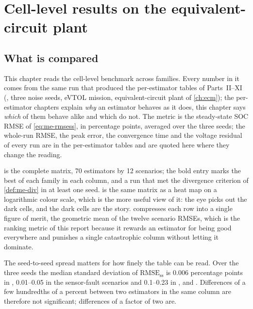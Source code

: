 \chapter{Cell-level results on the equivalent-circuit plant}
\label{ch:res-cell_ecm}

\section{What is compared}

This chapter reads the cell-level benchmark across families. Every number in it comes from
the same run that produced the per-estimator tables of Parts~II--XI
(, three noise seeds, eVTOL mission, equivalent-circuit plant of
\cref{ch:ecm}); the per-estimator chapters explain \emph{why} an estimator behaves as it does,
this chapter says \emph{which} of them behave alike and which do not. The metric is the
steady-state SOC RMSE of \cref{eq:me-rmsess}, in percentage points, averaged over the three
seeds; the whole-run RMSE, the peak error, the convergence time and the voltage residual of
every run are in the per-estimator tables and are quoted here where they change the reading.

 is the complete matrix, 70 estimators by 12 scenarios; the bold entry
marks the best of each family in each column, and  a run that met the divergence
criterion of \cref{def:me-div} in at least one seed.  is the same matrix
as a heat map on a logarithmic colour scale, which is the more useful view of it: the eye picks
out the dark cells, and the dark cells are the story.  compresses each row
into a single figure of merit, the geometric mean of the twelve scenario RMSEs, which is the
ranking metric of this report because it rewards an estimator for being good everywhere and
punishes a single catastrophic column without letting it dominate.

The seed-to-seed spread matters for how finely the table can be read. Over the three seeds the
median standard deviation of $\text{RMSE}_{\text{ss}}$ is \num{0.006} percentage points in
, \num{0.01}--\num{0.05} in the sensor-fault scenarios and \num{0.1}--\num{0.23}
in ,  and . Differences of a few
hundredths of a percent between two estimators in the same column are therefore not
significant; differences of a factor of two are.

